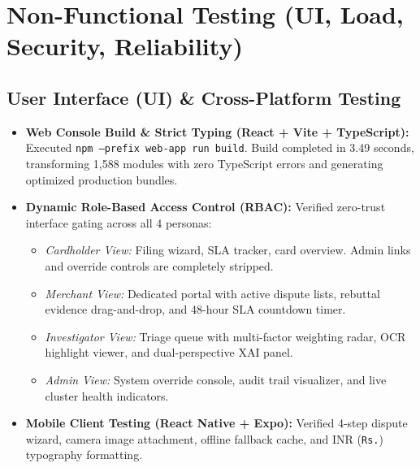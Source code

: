 \documentclass[11pt,a4paper]{article}
\begin{document}
\newpage

\section{Non-Functional Testing (UI, Load, Security, Reliability)}

\subsection{User Interface (UI) \& Cross-Platform Testing}
\begin{itemize}
    \item \textbf{Web Console Build \& Strict Typing (React + Vite + TypeScript):} Executed \texttt{npm --prefix web-app run build}. Build completed in 3.49 seconds, transforming 1,588 modules with zero TypeScript errors and generating optimized production bundles.
    \item \textbf{Dynamic Role-Based Access Control (RBAC):} Verified zero-trust interface gating across all 4 personas:
    \begin{itemize}
        \item \textit{Cardholder View:} Filing wizard, SLA tracker, card overview. Admin links and override controls are completely stripped.
        \item \textit{Merchant View:} Dedicated portal with active dispute lists, rebuttal evidence drag-and-drop, and 48-hour SLA countdown timer.
        \item \textit{Investigator View:} Triage queue with multi-factor weighting radar, OCR highlight viewer, and dual-perspective XAI panel.
        \item \textit{Admin View:} System override console, audit trail visualizer, and live cluster health indicators.
    \end{itemize}
    \item \textbf{Mobile Client Testing (React Native + Expo):} Verified 4-step dispute wizard, camera image attachment, offline fallback cache, and INR (\texttt{Rs.}) typography formatting.
\end{itemize}
\end{document}
